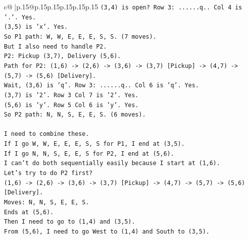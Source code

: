 \documentclass{article}
\begin{document}
{\begin{supertabular}{c@{$\;$}|p{.15\linewidth}@{}p{.15\linewidth}p{.15\linewidth}p{.15\linewidth}p{.15\linewidth}p{.15\linewidth}}
{{{\texttt{(3,4) is open? Row 3: ......q.. Col 4 is '.'. Yes.} \\
\texttt{(3,5) is 'x'. Yes.} \\
\texttt{So P1 path: W, W, E, E, E, S, S. (7 moves).} \\
\texttt{But I also need to handle P2.} \\
\texttt{P2: Pickup (3,7), Delivery (5,6).} \\
\texttt{Path for P2: (1,6) {-}> (2,6) {-}> (3,6) {-}> (3,7) {[}Pickup{]} {-}> (4,7) {-}> (5,7) {-}> (5,6) {[}Delivery{]}.} \\
\texttt{Wait, (3,6) is 'q'. Row 3: ......q.. Col 6 is 'q'. Yes.} \\
\texttt{(3,7) is '2'. Row 3 Col 7 is '2'. Yes.} \\
\texttt{(5,6) is 'y'. Row 5 Col 6 is 'y'. Yes.} \\
\texttt{So P2 path: N, N, S, E, E, S. (6 moves).} \\
\\ 
\texttt{I need to combine these.} \\
\texttt{If I go W, W, E, E, E, S, S for P1, I end at (3,5).} \\
\texttt{If I go N, N, S, E, E, S for P2, I end at (5,6).} \\
\texttt{I can't do both sequentially easily because I start at (1,6).} \\
\texttt{Let's try to do P2 first?} \\
\texttt{(1,6) {-}> (2,6) {-}> (3,6) {-}> (3,7) {[}Pickup{]} {-}> (4,7) {-}> (5,7) {-}> (5,6) {[}Delivery{]}.} \\
\texttt{Moves: N, N, S, E, E, S.} \\
\texttt{Ends at (5,6).} \\
\texttt{Then I need to go to (1,4) and (3,5).} \\
\texttt{From (5,6), I need to go West to (1,4) and South to (3,5).} \\
}}}
\end{supertabular}}
\end{document}

